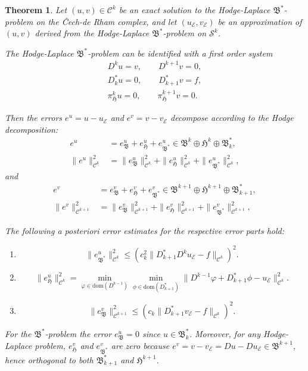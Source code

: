 \documentclass[reqno]{amsart}
\numberwithin{equation}{section}
\newtheorem{theorem}{Theorem}[section]
\theoremstyle{definition}
\newcommand{\Cc}{\mathcal{C}}
\newcommand{\Ec}{\mathcal{E}}
\newcommand{\Sc}{\mathcal{S}}
\newcommand{\Hf}{\mathfrak{H}}
\newcommand{\Bf}{\mathfrak{B}}
\newcommand{\dom}{\mathrm{dom}}
\begin{document}
\begin{theorem}\label{theorem: a posteriori}
Let $(u, v) \in \Cc^k$ be an exact solution to the Hodge-Laplace $\Bf^*$-problem on the \v{C}ech-de Rham complex, and let $(u_\Ec, v_\Ec)$ be an approximation of $(u, v)$ derived from the Hodge-Laplace $\Bf^*$-problem on $\Sc^k$.

The Hodge-Laplace $\Bf^*$-problem can be identified with a first order system 
\begin{subequations}
\begin{align}
D^k u = v, \qquad  D^{k+1}v=0,\\
D^*_{k} u = 0, \qquad  D_{k+1}^*v = f, \\
\pi^k_\Hf u =0, \qquad \pi^{k+1}_\Hf v=0.
\end{align}
\end{subequations}

Then the errors $e^u = u - u_\Ec$ and $e^v = v - v_\Ec$ decompose according to the Hodge decomposition:
\begin{align}
 e^u &= e^u_\Bf + e^u_\Hf + e^u_{\Bf^*} \in \Bf^k \oplus \Hf^k \oplus \Bf^*_k,   \\
 \|e^u\|^2_{\Cc^k} &= \| e^u_\Bf\|^2_{\Cc^k} + \|e^u_\Hf\|^2_{\Cc^k} + \|e^u_{\Bf^*}\|^2_{\Cc^k},
\end{align}
and 
\begin{align}
 e^v &= e^v_\Bf + e^v_\Hf + e^v_{\Bf^*} \in \Bf^{k+1} \oplus \Hf^{k+1} \oplus \Bf^*_{k+1},   \\
 \|e^v\|^2_{\Cc^{k+1}} &= \| e^v_\Bf\|^2_{\Cc^{k+1}} + \|e^v_\Hf\|^2_{\Cc^{k+1}} + \|e^v_{\Bf^*}\|^2_{\Cc^{k+1}},
\end{align}

The following a posteriori error estimates for the respective error parts hold:
\begin{enumerate}
\item 
\begin{equation}
\|e^u_{\Bf^*}\|^2_{\Cc^k} \leq \left( c_{k}^2 \|D^*_{k+1} D^k u_\Ec - f\|_{\Cc^{k}} \right)^2.
\end{equation}
\item 
\begin{equation}\label{eq: error of u_H}
\|e^u_{\Hf}\|^2_{\Cc^k} = \min_{\varphi \in \dom(D^{k-1})} \min_{\phi \in \dom(D^*_{k+1})} \| D^{k-1}\varphi + D^*_{k+1}\phi - u_\Ec \|_{\Cc^k}^2.
\end{equation}
\item 
\begin{equation}
\|e^v_\Bf\|_{\Cc^{k+1}}^2 \leq \left( c_k \|D^*_{k+1}v_\Ec - f\|_{\Cc^k} \right)^2.
\end{equation}
\end{enumerate}
For the $\Bf^*$-problem the error $e^u_\Bf = 0$ since $u \in \Bf^*_k$.
Moreover, for any Hodge-Laplace problem, $e^v_\Hf$ and $e^v_{\Bf^*}$ are zero because $e^v = v - v_\Ec = Du - Du_\Ec \in \Bf^{k+1}$, hence orthogonal to both $\Bf^*_{k+1}$ and $\Hf^{k+1}$.
\end{theorem}
\end{document}
